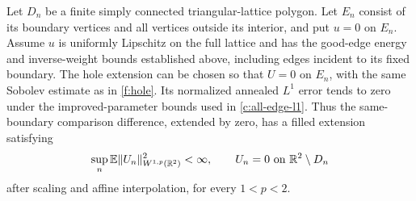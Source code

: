 \begin{lemma}\label{c:exterior-zero}
Let $D_n$ be a finite simply connected triangular-lattice polygon.
Let $E_n$ consist of its boundary vertices and all vertices outside
its interior, and put $u=0$ on $E_n$. Assume $u$ is uniformly
Lipschitz on the full lattice and has the good-edge energy and
inverse-weight bounds established above, including edges incident
to its fixed boundary. The hole extension can be chosen so that
$U=0$ on $E_n$, with the same Sobolev estimate as in
\ref{f:hole}. Its normalized annealed $L^1$ error tends to zero
under the improved-parameter bounds used in
\eqref{c:all-edge-l1}. Thus the same-boundary comparison difference,
extended by zero, has a filled extension satisfying
\[
 \sup_n\mathbb E\|U_n\|_{W^{1,p}(\mathbb R^2)}^2<\infty,\qquad
 U_n=0\ \hbox{on }\mathbb R^2\setminus D_n
\]
after scaling and affine interpolation, for every $1<p<2$.
\end{lemma}
